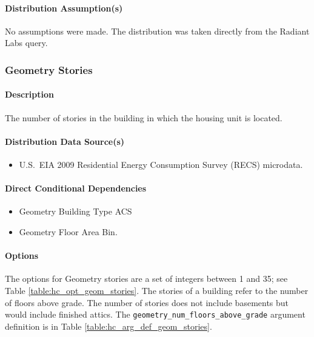 \paragraph{Distribution Assumption(s)}
No assumptions were made. The distribution was taken directly from the Radiant Labs query.

\subsubsection{Geometry Stories}
\paragraph{Description}
The number of stories in the building in which the housing unit is located.

\paragraph{Distribution Data Source(s)}
\begin{itemize}
    \item U.S.~EIA 2009 Residential Energy Consumption Survey (RECS) microdata.
\end{itemize}

\paragraph{Direct Conditional Dependencies}
\begin{itemize}
    \item Geometry Building Type ACS
    \item Geometry Floor Area Bin.
\end{itemize}

\paragraph{Options}
The options for Geometry stories are a set of integers between 1 and 35; see Table \ref{table:hc_opt_geom_stories}. The stories of a building refer to the number of floors above grade. The number of stories does not include basements but would include finished attics. The \texttt{geometry\_num\_floors\_above\_grade} argument definition is in Table \ref{table:hc_arg_def_geom_stories}.

